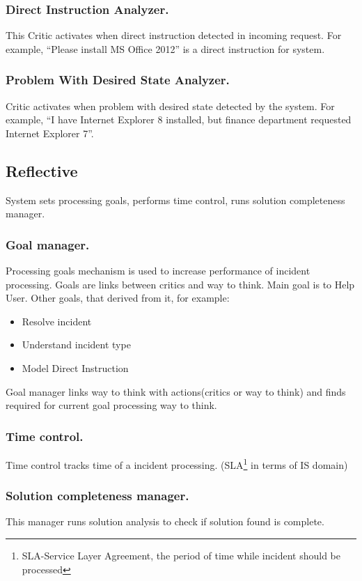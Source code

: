 \documentclass[runningheads,a4paper]{llncs}
\begin{document}
\begin{enumerate}
\subsubsection{Direct Instruction Analyzer.} This Critic activates when direct instruction detected in incoming request. For example, “Please install MS Office 2012” is a direct instruction for system.
\subsubsection{Problem With Desired State Analyzer.} Critic activates when problem with desired state detected by the system. For example, “I have Internet Explorer 8 installed, but finance department requested Internet Explorer 7”.

\subsection{Reflective}

System sets processing goals, performs time control, runs solution completeness manager.

\subsubsection{Goal manager.} Processing goals mechanism is used to increase performance of incident processing. Goals are links between critics and way to think. Main goal is to Help User. Other goals, that derived from it, for example:
\begin{itemize}
 \item Resolve incident
 \item Understand incident type
 \item Model Direct Instruction
\end{itemize}
Goal manager links way to think with actions(critics or way to think) and finds required for current goal processing way to think.

\subsubsection{Time control.} Time control tracks time of a incident processing. (SLA\footnote{SLA-Service Layer Agreement, the period of time while incident should be processed} in terms of IS domain)

\subsubsection{Solution completeness manager.} This manager runs solution analysis to check if solution found is complete.


\end{enumerate}
\end{document}
